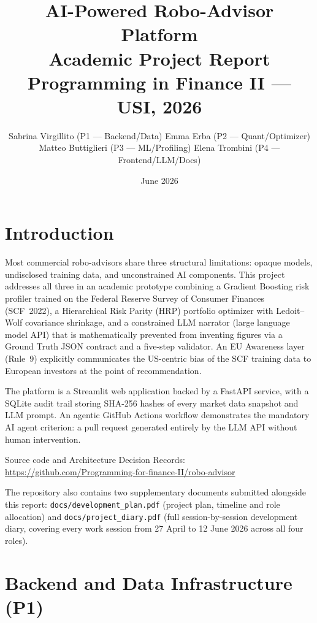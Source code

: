 \documentclass[11pt, a4paper]{article}
\title{%
  \textbf{AI-Powered Robo-Advisor Platform}\\[0.4em]
  \large Academic Project Report\\
  Programming in Finance II — USI, 2026
}
\author{%
  Sabrina Virgillito (P1 — Backend/Data) \quad Emma Erba (P2 — Quant/Optimizer)\\
  Matteo Buttiglieri (P3 — ML/Profiling) \quad Elena Trombini (P4 — Frontend/LLM/Docs)
}
\date{June 2026}
\begin{document}
\maketitle
\tableofcontents
\newpage

\section{Introduction}

Most commercial robo-advisors share three structural limitations: opaque models, undisclosed training data, and unconstrained AI components. This project addresses all three in an academic prototype combining a Gradient Boosting risk profiler trained on the Federal Reserve Survey of Consumer Finances (SCF~2022), a Hierarchical Risk Parity (HRP) portfolio optimizer with Ledoit--Wolf covariance shrinkage, and a constrained LLM narrator (large language model API) that is mathematically prevented from inventing figures via a Ground Truth JSON contract and a five-step validator. An EU Awareness layer (Rule~9) explicitly communicates the US-centric bias of the SCF training data to European investors at the point of recommendation.

The platform is a Streamlit web application backed by a FastAPI service, with a SQLite audit trail storing SHA-256 hashes of every market data snapshot and LLM prompt. An agentic GitHub Actions workflow demonstrates the mandatory AI agent criterion: a pull request generated entirely by the LLM API without human intervention.

Source code and Architecture Decision Records: \url{https://github.com/Programming-for-finance-II/robo-advisor}

The repository also contains two supplementary documents submitted alongside this report: \texttt{docs/development\_plan.pdf} (project plan, timeline and role allocation) and \texttt{docs/project\_diary.pdf} (full session-by-session development diary, covering every work session from 27 April to 12 June 2026 across all four roles).

\section{Backend and Data Infrastructure (P1)}
\end{document}
